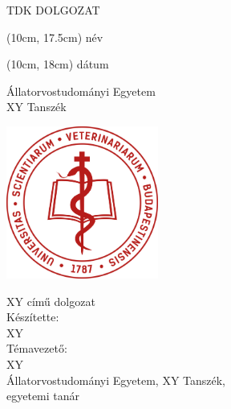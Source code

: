 \documentclass[a4paper, oneside, 12pt]{memoir}
\newcommand{\thesistype}[1][TDK DOLGOZAT]{#1}
\newcommand{\unianddepartment}[1][{\Large Állatorvostudományi Egyetem\\XY Tanszék}]{#1}
\newcommand{\thesistitle}[1][XY című dolgozat]{#1}
\newcommand{\student}[1][{\large Készítette:}\\XY]{#1}
\newcommand{\teacher}[1][{\large Témavezető:}\\XY\\{\small Állatorvostudományi Egyetem, XY Tanszék,}\\{\small egyetemi tanár}]{#1}
\begin{document}
\justifying



\begin{center}
\vspace*{2cm}
\LARGE
\thesistype
\end{center}

\begin{textblock*}{20cm}(10cm, 17.5cm)
név
\end{textblock*}

\begin{textblock*}{20cm}(10cm, 18cm)
dátum
\end{textblock*}


\newpage



\begin{center}
\vspace*{0.5cm}
\unianddepartment\\
\vspace{2cm}
\begin{center}
\includegraphics[width=5cm]{logo.jpg}
\end{center}
\vspace{2cm}
\huge
\thesistitle\\
\vspace{2cm}
\normalsize
\student\\
\vspace{0.8cm}
\teacher\\
\end{center}


\newpage

\setcounter{page}{1}
\end{document}

